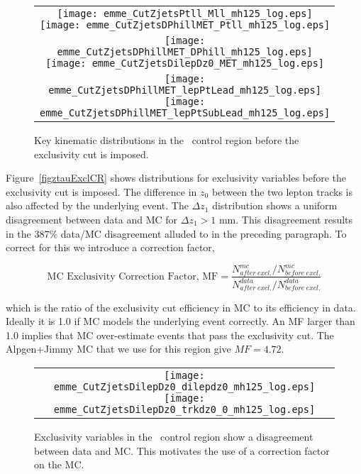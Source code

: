 \begin{figure}[!h]
\centering
\begin{tabular}{c}
	\texttt{[image: emme\_CutZjetsPtll\_Mll\_mh125\_log.eps]}
	\texttt{[image: emme\_CutZjetsDPhillMET\_Ptll\_mh125\_log.eps]}\\
	\texttt{[image: emme\_CutZjetsDPhillMET\_DPhill\_mh125\_log.eps]}
	\texttt{[image: emme\_CutZjetsDilepDz0\_MET\_mh125\_log.eps]}\\
	\texttt{[image: emme\_CutZjetsDPhillMET\_lepPtLead\_mh125\_log.eps]}
	\texttt{[image: emme\_CutZjetsDPhillMET\_lepPtSubLead\_mh125\_log.eps]}\\
\end{tabular}
\caption{Key kinematic distributions in the \Ztau\ control region before the exclusivity cut is imposed.}
\label{fig:ztauCR}
\end{figure}

\par Figure~\ref{figztauExclCR} shows distributions for exclusivity variables before the exclusivity cut is imposed.
The difference in $z_0$ between the two lepton tracks is also affected by the underlying event. The $\Delta z_1$
distribution shows a uniform disagreement between data and MC for $\Delta z_1>1$ mm. This disagreement results in the 
387\% data/MC disagreement alluded to in the preceding paragraph. To correct for this we introduce  a correction factor, 

\begin{equation}
\mbox{MC Exclusivity Correction Factor, MF} = \frac{N^{mc}_{after\ excl.}/N^{mc}_{before\ excl.}}{N^{data}_{after\ excl.}/N^{data}_{before\ excl.}}
\end{equation}

which is the ratio of the exclusivity cut efficiency in MC to its efficiency in data.
Ideally it is 1.0 if MC models the underlying event correctly. An MF larger than 1.0 implies that MC over-estimate
events that pass the exclusivity cut. The Alpgen+Jimmy MC that we use for this region give $MF=4.72$. 
 
\begin{figure}[!h]
\centering
\begin{tabular}{c}
	\texttt{[image: emme\_CutZjetsDilepDz0\_dilepdz0\_mh125\_log.eps]}
	\texttt{[image: emme\_CutZjetsDilepDz0\_trkdz0\_0\_mh125\_log.eps]}\\
\end{tabular}
\caption{Exclusivity variables in the \Ztau\ control region show a disagreement between data and MC. This
motivates the use of a correction factor on the MC.}
\label{fig:ztauExclCR}
\end{figure}

